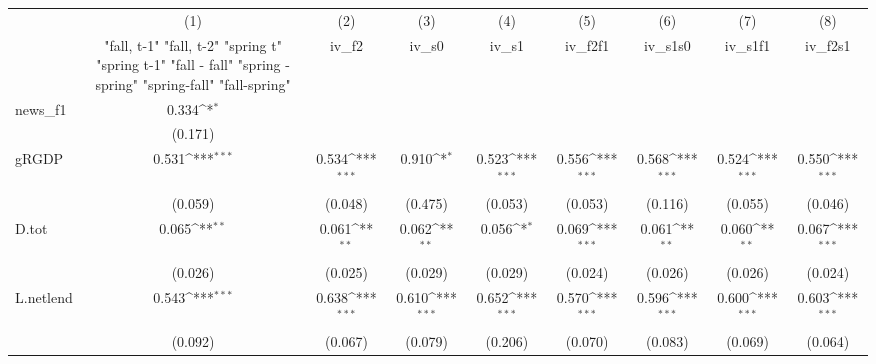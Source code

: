 {
\def\sym#1{\ifmmode^{#1}\else\(^{#1}\)\fi}
\begin{tabular}{l*{8}{c}}
\toprule
            &\multicolumn{1}{c}{(1)}&\multicolumn{1}{c}{(2)}&\multicolumn{1}{c}{(3)}&\multicolumn{1}{c}{(4)}&\multicolumn{1}{c}{(5)}&\multicolumn{1}{c}{(6)}&\multicolumn{1}{c}{(7)}&\multicolumn{1}{c}{(8)}\\
            &\multicolumn{1}{c}{  "fall, t-1" "fall, t-2" "spring t" "spring t-1"  "fall - fall" "spring - spring" "spring-fall" "fall-spring" }&\multicolumn{1}{c}{iv\_f2}&\multicolumn{1}{c}{iv\_s0}&\multicolumn{1}{c}{iv\_s1}&\multicolumn{1}{c}{iv\_f2f1}&\multicolumn{1}{c}{iv\_s1s0}&\multicolumn{1}{c}{iv\_s1f1}&\multicolumn{1}{c}{iv\_f2s1}\\
\midrule
news\_f1     &       0.334\sym{*}  &                     &                     &                     &                     &                     &                     &                     \\
            &     (0.171)         &                     &                     &                     &                     &                     &                     &                     \\
\addlinespace
gRGDP       &       0.531\sym{***}&       0.534\sym{***}&       0.910\sym{*}  &       0.523\sym{***}&       0.556\sym{***}&       0.568\sym{***}&       0.524\sym{***}&       0.550\sym{***}\\
            &     (0.059)         &     (0.048)         &     (0.475)         &     (0.053)         &     (0.053)         &     (0.116)         &     (0.055)         &     (0.046)         \\
\addlinespace
D.tot       &       0.065\sym{**} &       0.061\sym{**} &       0.062\sym{**} &       0.056\sym{*}  &       0.069\sym{***}&       0.061\sym{**} &       0.060\sym{**} &       0.067\sym{***}\\
            &     (0.026)         &     (0.025)         &     (0.029)         &     (0.029)         &     (0.024)         &     (0.026)         &     (0.026)         &     (0.024)         \\
\addlinespace
L.netlend   &       0.543\sym{***}&       0.638\sym{***}&       0.610\sym{***}&       0.652\sym{***}&       0.570\sym{***}&       0.596\sym{***}&       0.600\sym{***}&       0.603\sym{***}\\
            &     (0.092)         &     (0.067)         &     (0.079)         &     (0.206)         &     (0.070)         &     (0.083)         &     (0.069)         &     (0.064)         \\

\end{tabular}}
